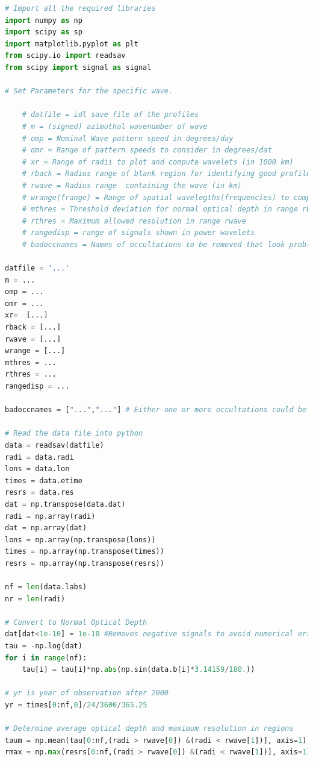 \documentclass{article}
\begin{document}
\begin{lstlisting}[language=Python, caption=Python code snippet for Spiral Density Wave Analysis.]
# Import all the required libraries 
import numpy as np
import scipy as sp
import matplotlib.pyplot as plt
from scipy.io import readsav
from scipy import signal as signal

# Set Parameters for the specific wave.
   
    # datfile = idl save file of the profiles
    # m = (signed) azimuthal wavenumber of wave
    # omp = Nominal Wave pattern speed in degrees/day
    # omr = Range of pattern speeds to consider in degrees/dat
    # xr = Range of radii to plot and compute wavelets (in 1000 km)
    # rback = Radius range of blank region for identifying good profiles (in km)
    # rwave = Radius range  containing the wave (in km)
    # wrange(frange) = Range of spatial wavelegths(frequencies) to compute in the wavelet
    # mthres = Threshold deviation for normal optical depth in range rback
    # rthres = Maximum allowed resolution in range rwave
    # rangedisp = range of signals shown in power wavelets
    # badoccnames = Names of occultations to be removed that look problematic on visual inspection

datfile = '...'
m = ...
omp = ...
omr = ...
xr=  [...]
rback = [...]
rwave = [...] 
wrange = [...]
mthres = ...
rthres = ...
rangedisp = ...

badoccnames = ["...","..."] # Either one or more occultations could be bad.

# Read the data file into python
data = readsav(datfile)
radi = data.radi
lons = data.lon
times = data.etime
resrs = data.res
dat = np.transpose(data.dat)
radi = np.array(radi)
dat = np.array(dat)
lons = np.array(np.transpose(lons))
times = np.array(np.transpose(times))
resrs = np.array(np.transpose(resrs))

nf = len(data.labs)
nr = len(radi)

# Convert to Normal Optical Depth
dat[dat<1e-10] = 1e-10 #Removes negative signals to avoid numerical errors for log transform
tau = -np.log(dat)
for i in range(nf):
    tau[i] = tau[i]*np.abs(np.sin(data.b[i]*3.14159/180.))

# yr is year of observation after 2000    
yr = times[0:nf,0]/24/3600/365.25

# Determine average optical depth and maximum resolution in regions
taum = np.mean(tau[0:nf,(radi > rwave[0]) &(radi < rwave[1])], axis=1)
rmax = np.max(resrs[0:nf,(radi > rwave[0]) &(radi < rwave[1])], axis=1)


\end{lstlisting}
\end{document}

